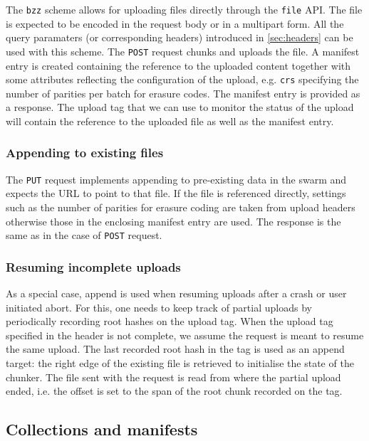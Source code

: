 The \lstinline{bzz} scheme allows for uploading files directly through the \lstinline{file} API. The file is expected to be encoded in the request body or in a multipart form. All the query paramaters (or corresponding headers)  introduced in \ref{sec:headers} can be used with this scheme. The \lstinline{POST} request chunks and uploads the file. A manifest entry is created containing the reference to the uploaded content together with some attributes reflecting the configuration of the upload, e.g. \lstinline{crs} specifying the number of parities per batch for erasure codes.
The manifest entry is provided as a response. The upload tag that we can use to monitor the status of the upload will contain the reference to the uploaded file as well as the manifest entry.

\subsubsection{Appending to existing files}\label{sec:append}

The \lstinline{PUT} request implements appending to pre-existing data in the swarm and expects the URL to point to that file. If the file is referenced directly, settings such as the number of parities for erasure coding are taken from upload headers otherwise those in the enclosing manifest entry are used. The response is the same as in the case of \lstinline{POST} request.


\subsubsection{Resuming incomplete uploads}\label{sec:resume}

As a special case, append is used when resuming uploads after a crash or user initiated abort. For this, one needs to keep track of partial uploads by periodically recording root hashes on the upload tag. When the upload tag specified in the header is not complete, we assume the request is meant to resume the same upload. The last recorded root hash in the tag is used as an append target: the right edge of the existing file is retrieved to initialise the state of the chunker. The file sent with the request is read from where the partial upload ended, i.e. the offset is set to the span of the root chunk recorded on the tag.

\subsection{Collections and manifests \statusgreen}\label{sec:manifests-ux}

